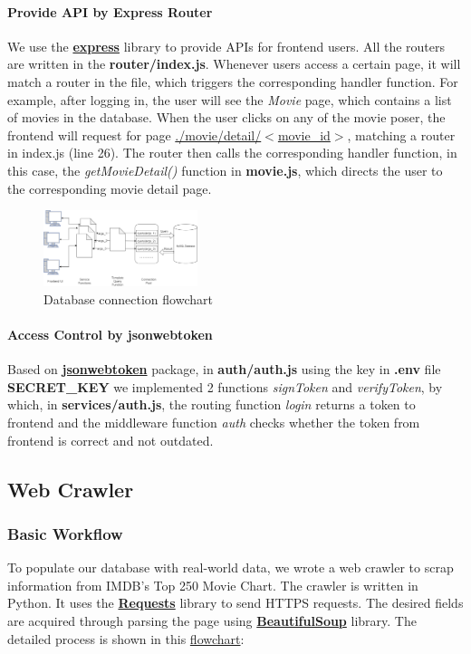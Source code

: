 \begin{CJK*}{UTF8}{gbsn}
\paragraph{Provide API by Express Router}
We use the \textbf{\href{https://expressjs.com}{express}} library to provide APIs for frontend users. All the routers are written in the \textbf{router/index.js}. Whenever users access a certain page, it will match a router in the file, which triggers the corresponding handler function. For example, after logging in, the user will see the \textit{Movie} page, which contains a list of movies in the database. When the user clicks on any of the movie poser, the frontend will request for page \underline{./movie/detail/$<$movie\_id$>$}, matching a router in index.js (line 26). The router then calls the corresponding handler function, in this case, the \textit{getMovieDetail()} function in \textbf{movie.js}, which directs the user to the corresponding movie detail page.
\begin{figure}[h]
    \centering
    \includegraphics[width=0.4\textwidth]{sqlconnect.png}
    \caption{Database connection flowchart}
\end{figure}
\paragraph{Access Control by jsonwebtoken}
\label{sec:access}
Based on \textbf{\href{https://www.npmjs.com/package/jsonwebtoken}{jsonwebtoken}} package, in \textbf{auth/auth.js} using the key in \textbf{.env} file \textbf{SECRET\_KEY} we implemented 2 functions \textit{signToken} and \textit{verifyToken}, by which, in \textbf{services/auth.js}, the routing function \textit{login} returns a token to frontend and the middleware function \textit{auth} checks whether the token from frontend is correct and not outdated.

\subsection{Web Crawler}
\subsubsection{Basic Workflow}
To populate our database with real-world data, we wrote a web crawler to scrap information from IMDB's Top 250 Movie Chart. The crawler is written in Python. It uses the \textbf{\href{https://docs.python-requests.org/en/latest/}{Requests}} library to send HTTPS requests. The desired fields are acquired through parsing the page using \textbf{\href{https://www.crummy.com/software/BeautifulSoup/bs4/doc/}{BeautifulSoup}} library.
The detailed process is shown in this \hyperref[crawler]{flowchart}:\par


\end{CJK*}

